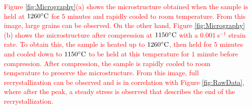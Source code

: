 \documentclass[metals,article,submit,pdftex,moreauthors]{Definitions/mdpi}
\begin{document}
\textcolor{red}{Figure \ref{fig:Micrography}(a) shows the microstructure obtained when the sample is held at $1260\celsius$ for $5$ minutes and rapidly cooled to room temperature. From this image, large grains can be observed. On the other hand, Figure \ref{fig:Micrography}(b) shows the microstructure after compression at $1150\celsius$ with a $0.001~\text{s}^{-1}$ strain rate. To obtain this, the sample is heated up to $1260\celsius$, then held for $5$ minutes and cooled down to $1150\celsius$ to be held at this temperature for $1$ minute before compression. After compression, the sample is rapidly cooled to room temperature to preserve the microstructure. From this image, full recrystallization can be observed and is in correlation with Figure \ref{fig:RawData}, where after the peak, a steady stress is observed that describes the end of the recrystallization.}
\end{document}
